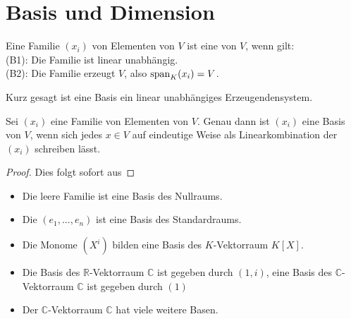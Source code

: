 \section{Basis und Dimension}

\begin{definition}[Basis]
	Eine Familie $(x_i)$ von Elementen von $V$ ist eine  von $V$, wenn gilt: \\
	(B1): Die Familie ist linear unabhängig. \\
	(B2): Die Familie erzeugt $V$, also $\operatorname{span}_K(x_i) = V$.
\end{definition}

\begin{remark}
	Kurz gesagt ist eine Basis ein linear unabhängiges Erzeugendensystem.
\end{remark}

\begin{proposition}
	Sei $(x_i)$ eine Familie von Elementen von $V$. Genau dann ist $(x_i)$ eine Basis von $V$, 
	wenn sich jedes $x \in V$ auf eindeutige Weise als Linearkombination der $(x_i)$ schreiben lässt.
\end{proposition}
\begin{proof}
	Dies folgt sofort aus 
\end{proof}

\begin{example}
	\begin{itemize}
		\item Die leere Familie ist eine Basis des Nullraums.
		\item Die  $(e_1,...,e_n)$ ist eine Basis des Standardraums.
		\item Die Monome $(X^i)$ bilden eine Basis des $K$-Vektorraum $K[X]$.
		\item Die Basis des $\mathbb R$-Vektorraum $\mathbb C$ ist gegeben durch $(1,i)$, eine Basis des $\mathbb C$-
		Vektorraum $\mathbb C$ ist gegeben durch $(1)$
		\item Der $\mathbb C$-Vektorraum $\mathbb C$ hat viele weitere Basen.
	\end{itemize}
\end{example}

